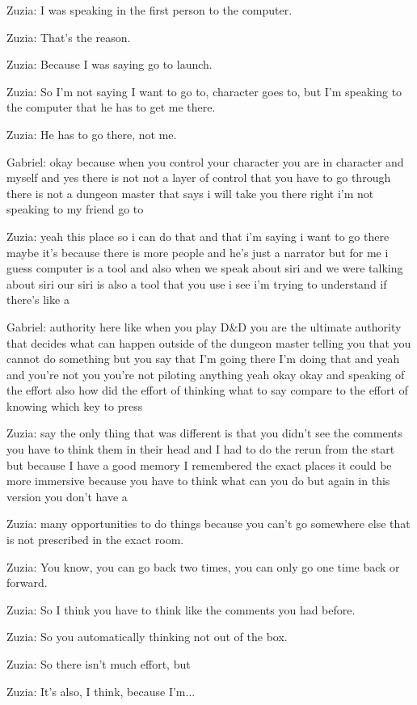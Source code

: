 Zuzia: I was speaking in the first person to the computer.

Zuzia: That's the reason.

Zuzia: Because I was saying go to launch.

Zuzia: So I'm not saying I want to go to, character goes to, but I'm speaking to the computer that he has to get me there.

Zuzia: He has to go there, not me.

Gabriel: okay because when you control your character you are in character and myself and yes there is not not a layer of control that you have to go through there is not a dungeon master that says i will take you there right i'm not speaking to my friend go to

Zuzia: yeah this place so i can do that and that i'm saying i want to go there maybe it's because there is more people and he's just a narrator but for me i guess computer is a tool and also when we speak about siri and we were talking about siri our siri is also a tool that you use i see i'm trying to understand if there's like a

Gabriel: authority here like when you play D&D you are the ultimate authority that decides what can happen outside of the dungeon master telling you that you cannot do something but you say that I'm going there I'm doing that and yeah and you're not you you're not piloting anything yeah okay okay and speaking of the effort also how did the effort of thinking what to say compare to the effort of knowing which key to press

Zuzia: say the only thing that was different is that you didn't see the comments you have to think them in their head and I had to do the rerun from the start but because I have a good memory I remembered the exact places it could be more immersive because you have to think what can you do but again in this version you don't have a

Zuzia: many opportunities to do things because you can't go somewhere else that is not prescribed in the exact room.

Zuzia: You know, you can go back two times, you can only go one time back or forward.

Zuzia: So I think you have to think like the comments you had before.

Zuzia: So you automatically thinking not out of the box.

Zuzia: So there isn't much effort, but

Zuzia: It's also, I think, because I'm...

